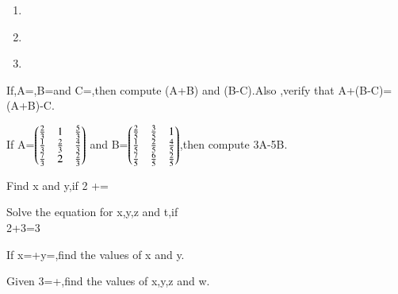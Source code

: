 \begin{enumerate}
\item {} 
\item {} \\
\item  {}
\end{enumerate}
\item If,A=,B=and C=,then compute (A+B) and (B-C).Also ,verify that A+(B-C)=(A+B)-C.\\
\item If A=$\begin{pmatrix}\frac{2}{3} & 1 & \frac{5}{3}\\ \frac{1}{3} & \frac{2}{3} & \frac{4}{3} \\ \frac{7}{3} &2  & \frac{2}{3}\end{pmatrix}$ and B=$\begin{pmatrix}\frac{2}{5} & \frac{3}{5} &1 \\ \frac{1}{5} & \frac{2}{5} & \frac{4}{5}\\ \frac{7}{5} & \frac{6}{5} & \frac{2}{5}\end{pmatrix}$,then compute 3A-5B.\\

\item Find x and y,if 2 +=\\
\item Solve the equation for x,y,z and t,if \\
2+3=3\\
\item If x=+y=,find the values of x and y.\\
\item Given 3=+,find the values of x,y,z and w.\\


